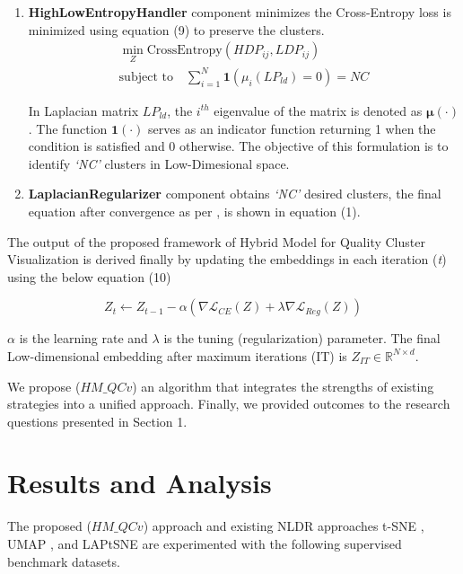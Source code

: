 \begin{enumerate}[label=\roman*]
    \item \textbf{HighLowEntropyHandler} component minimizes the Cross-Entropy loss \cite{goodfellow2016deep} is minimized using equation (9) to preserve the clusters. 
    \begin{equation}
\begin{split}
    \min_{Z} \text{CrossEntropy}(HDP_{ij}, LDP_{ij}) \\
    \text{subject to} \quad \sum_{i=1}^{N} \bm{1}(\mu_i (LP_{ld}) = 0) = NC
\end{split}
\end{equation}

  
    In Laplacian matrix $LP_{ld}$, the $i^{th}$ eigenvalue of the matrix is denoted as \( \bm{\mu}(\cdot)\). The function \( \bm{1}(\cdot)\) serves as an indicator function returning 1 when the condition is satisfied and 0 otherwise. The objective of this formulation is to identify \textit{`NC'} clusters in Low-Dimesional space. 

    \item \textbf{LaplacianRegularizer} component obtains \textit{`NC'} desired clusters, the final equation after convergence as per \cite{sun2023laplacian}, is shown in equation (1).




\end{enumerate}
The output of the proposed framework of  Hybrid Model for Quality Cluster Visualization is derived finally by updating the embeddings in each iteration (\textit{t}) using the below equation (10)

\begin{equation}
    Z_t \leftarrow Z_{t-1} - \alpha \left( \nabla \mathcal{L}_{CE}(Z) + \lambda \nabla \mathcal{L}_{Reg}(Z) \right)
\end{equation}

$\alpha$ is the learning rate and $\lambda$ is the tuning (regularization) parameter.
The final Low-dimensional embedding after maximum iterations (IT) is $Z_{IT} \in \mathbb{R}^{N \times d}$.


We propose ($HM\_QCv$) an algorithm that integrates the strengths of existing strategies \cite{tsne} \cite{umap_reference} \cite{sun2023laplacian} into a unified approach. Finally, we provided outcomes to the research questions presented in Section 1.


\section{Results and Analysis}
The proposed ($HM\_QCv$) approach and existing NLDR approaches t-SNE \cite{tsne}, UMAP \cite{umap_reference}, and LAPtSNE \cite{sun2023laplacian} are experimented with the following supervised benchmark datasets.

